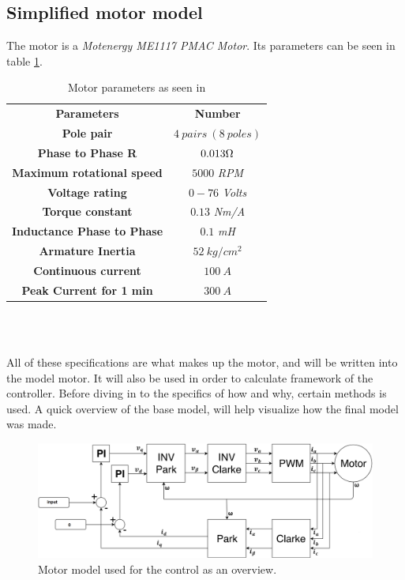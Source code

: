 \subsection{Simplified motor model}
The motor is a \textit{Motenergy ME1117 PMAC Motor}. Its parameters can be seen in table \ref{Motor_parameters_list}.

\begin{table} [H]
    \centering
    \begin{tabular}{|c|c|} \cline{1-2}
        \textbf{Parameters} & \textbf{Number} \\ \cline{1-2}
        \textbf{Pole pair} & $4\ pairs\ (8\ poles)$ \\ \cline{1-2}
        \textbf{Phase to Phase R} & $0.013\ohm$ \\ \cline{1-2}
        \textbf{Maximum rotational speed} & $5000$ \textit{RPM} \\ \cline{1-2}
        \textbf{Voltage rating} & $0-76$ \textit{Volts} \\ \cline{1-2}
        \textbf{Torque constant} & $0.13$ \textit{Nm/A} \\ \cline{1-2}
        \textbf{Inductance Phase to Phase} & $0.1$ \textit{mH} \\ \cline{1-2}
        \textbf{Armature Inertia} & $52\ kg/cm^2$ \\ \cline{1-2}
        \textbf{Continuous current} & $100\ A$ \\ \cline{1-2}
        \textbf{Peak Current for 1 min} & $300\ A$ \\ \cline{1-2}  
    \end{tabular} \\
    \caption{Motor parameters as seen in \cite{Motor_Parameters}}
    \label{Motor_parameters_list}
\end{table} \\

All of these specifications are what makes up the motor, and will be written into the model motor. It will also be used in order to calculate framework of the controller. Before diving in to the specifics of how and why, certain methods is used. A quick overview of the base model, will help visualize how the final model was made.\\

\begin{figure} [H]
    \centering
    \includegraphics[scale=0.42]{pictures/control/udklip.PNG}
    \caption{Motor model used for the control as an overview.}
    \label{fig:Motor_model}
\end{figure} \\

